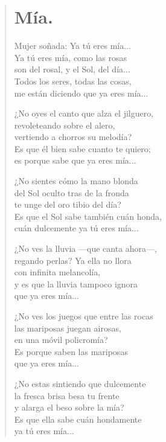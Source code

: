 \documentclass[11pt, portrait, twoside, notitlepage, openright]{book}
\begin{document}
\newpage
\begin{verse}
\begin{center}
\section{Mía.}
\end{center}
Mujer soñada: Ya tú eres mía...\\
Ya tú eres mía, como las rosas\\
son del rosal, y el Sol, del día...\\
Todos los seres, todas las cosas,\\
me están diciendo que ya eres mía...
\newline

¿No oyes el canto que alza el jilguero,\\
revoleteando sobre el alero,\\
vertiendo a chorros su melodía?\\
Es que él bien sabe cuanto te quiero;\\
es porque sabe que ya eres mía...
\newline

¿No sientes cómo la mano blonda\\
del Sol oculto tras de la fronda\\
te unge del oro tibio del día?\\
Es que el Sol sabe también cuán honda,\\
cuán dulcemente ya tú eres mía...
\newline

¿No ves la lluvia —que canta ahora—,\\
regando perlas? Ya ella no llora\\
con infinita melancolía,\\
y es que la lluvia tampoco ignora\\
que ya eres mía...
\newpage

¿No ves los juegos que entre las rocas\\
 las mariposas juegan airosas,\\
en una móvil policromía?\\
Es porque saben las mariposas\\
que ya eres mía...
\newline

¿No estas sintiendo que dulcemente\\
la fresca brisa besa tu frente\\
y alarga el beso sobre la mía?\\
Es que ella sabe cuán hondamente\\
ya tú eres mía...
\newline


\end{verse}
\end{document}
